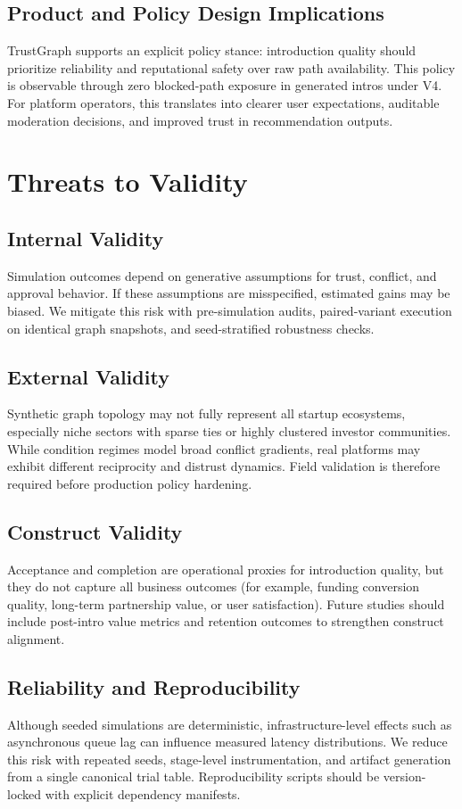 \documentclass[conference]{IEEEtran}
\begin{document}
\subsection{Product and Policy Design Implications}
TrustGraph supports an explicit policy stance: introduction quality should prioritize reliability and reputational safety over raw path availability. This policy is observable through zero blocked-path exposure in generated intros under V4. For platform operators, this translates into clearer user expectations, auditable moderation decisions, and improved trust in recommendation outputs.

\section{Threats to Validity}
\subsection{Internal Validity}
Simulation outcomes depend on generative assumptions for trust, conflict, and approval behavior. If these assumptions are misspecified, estimated gains may be biased. We mitigate this risk with pre-simulation audits, paired-variant execution on identical graph snapshots, and seed-stratified robustness checks.

\subsection{External Validity}
Synthetic graph topology may not fully represent all startup ecosystems, especially niche sectors with sparse ties or highly clustered investor communities. While condition regimes model broad conflict gradients, real platforms may exhibit different reciprocity and distrust dynamics. Field validation is therefore required before production policy hardening.

\subsection{Construct Validity}
Acceptance and completion are operational proxies for introduction quality, but they do not capture all business outcomes (for example, funding conversion quality, long-term partnership value, or user satisfaction). Future studies should include post-intro value metrics and retention outcomes to strengthen construct alignment.

\subsection{Reliability and Reproducibility}
Although seeded simulations are deterministic, infrastructure-level effects such as asynchronous queue lag can influence measured latency distributions. We reduce this risk with repeated seeds, stage-level instrumentation, and artifact generation from a single canonical trial table. Reproducibility scripts should be version-locked with explicit dependency manifests.
\end{document}
